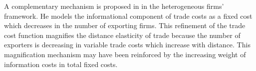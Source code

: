 \documentclass[12pt,twoside,a4paper,notitlepage]{article}
\begin{document}
A complementary mechanism is proposed in \cite{Krautheim2012} in the heterogeneous firms' framework. He models the informational component of trade costs as a fixed cost which decreases in the number of exporting firms. This refinement of the trade cost function magnifies the distance elasticity of trade because the number of exporters is decreasing in variable trade costs which increase with distance. This magnification mechanism may have been reinforced by the increasing weight of information costs in total fixed costs.
\end{document}
